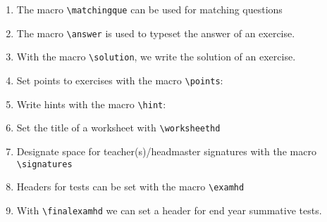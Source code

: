 \documentclass[12pt,a4page]{article}
\def\cellwidth{0.4\textwidth}
\newcommand{\miniexample}[3][t]{%
  \parbox[#1][#3][t]{\cellwidth}{#2}
}
\newcommand{\codeexample}[3][c]{%
  \colorbox[HTML]{b0c4be}{\miniexample[#1]{}{#3}}
}
\newcommand{\textexample}[3][c]{%
  {\footnotesize
    \colorbox[gray]{0.9}{\miniexample[#1]{}{#3}}%
  }
}
\newcommand{\examplerow}[3][10pt]{%
  \par\noindent\strut\hfill\codeexample{#2}{#3}\hspace{#1}\textexample{#2}{#3}\hfill\strut
}
\newlength{\exheight}
\begin{document}
\begin{enumerate}
\item The macro \verb|\matchingque| can be used for matching questions
  \setlength{\exheight}{117pt}
  \setlength{\leftmatchwidth}{10em}
  \setlength{\rightmatchwidth}{10em}
  \examplerow{exampleMacroMatchingque.tex}{\exheight}
\item The macro \verb/\answer/ is used to typeset the answer of an exercise.
  \setlength{\exheight}{49pt}
  \examplerow{exampleMacroAnswer.tex}{\exheight}
\item With the macro \verb|\solution|, we write the solution of an exercise.
  \setlength{\exheight}{98pt}
  \examplerow{exampleMacroSolution.tex}{\exheight}
\item Set points to exercises with the macro \verb|\points|:
  \setlength{\exheight}{169pt}
  \examplerow{exampleMacroPoints.tex}{\exheight}

  \newpage

\item Write hints with the macro \verb|\hint|:
  \setlength{\exheight}{180pt}
  \examplerow{exampleMacroHint.tex}{\exheight}
\item Set the title of a worksheet with \verb|\worksheethd|
  \setlength{\exheight}{70pt}
  \examplerow{exampleMacroWorksheethd.tex}{\exheight}
\item Designate space for teacher(s)/headmaster signatures with the macro
  \verb|\signatures|
  \setlength{\exheight}{72pt}
  \setlength{\signatureslength}{80pt}
  \setlength{\signaturelineskip}{25pt}
  \examplerow{exampleMacroSignatures.tex}{\exheight}
\item Headers for tests can be set with the macro \verb|\examhd|
  \setlength{\exheight}{67pt}
  \examplerow{exampleMacroExamhd.tex}{\exheight}
\item With \verb|\finalexamhd| we can set a header for end year summative tests.
  \setlength{\exheight}{39pt}
  \examplerow{exampleMacroFinalExamhd.tex}{\exheight}


\end{enumerate}
\end{document}
